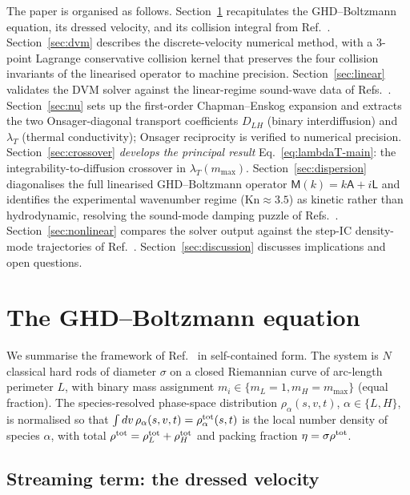\documentclass[aps,pre,twocolumn,superscriptaddress,longbibliography,floatfix]{revtex4-2}
\begin{document}
The paper is organised as follows.
Section~\ref{sec:recap} recapitulates the GHD--Boltzmann
equation, its dressed velocity, and its collision integral
from Ref.~\cite{PaperIV}.
Section~\ref{sec:dvm} describes the discrete-velocity numerical
method, with a 3-point Lagrange conservative collision kernel
that preserves the four collision invariants of the linearised
operator to machine precision.
Section~\ref{sec:linear} validates the DVM solver against
the linear-regime sound-wave data of
Refs.~\cite{PaperII,PaperIV}.
Section~\ref{sec:nu} sets up the first-order Chapman--Enskog
expansion and extracts the two Onsager-diagonal transport
coefficients $D_{LH}$ (binary interdiffusion) and $\lambda_T$
(thermal conductivity); Onsager reciprocity is verified to
numerical precision.
Section~\ref{sec:crossover} \emph{develops the principal
result} Eq.~\eqref{eq:lambdaT-main}: the
integrability-to-diffusion crossover in $\lambda_T(m_{\max})$.
Section~\ref{sec:dispersion} diagonalises the full
linearised GHD--Boltzmann operator
$\mathsf{M}(k)=k\mathsf{A}+i\mathsf{L}$ and identifies the
experimental wavenumber regime ($\mathrm{Kn}\approx 3.5$)
as kinetic rather than hydrodynamic, resolving the
sound-mode damping puzzle of Refs.~\cite{PaperII,PaperIV}.
Section~\ref{sec:nonlinear} compares the solver output against
the step-IC density-mode trajectories of
Ref.~\cite{PaperIII}.
Section~\ref{sec:discussion} discusses implications and open
questions.

\section{The GHD--Boltzmann equation}\label{sec:recap}

We summarise the framework of Ref.~\cite{PaperIV} in
self-contained form. The system is $N$ classical hard rods of
diameter $\sigma$ on a closed Riemannian curve of arc-length
perimeter $L$, with binary mass assignment
$m_i\in\{m_L=1, m_H=m_{\max}\}$ (equal fraction). The
species-resolved phase-space distribution
$\rho_\alpha(s,v,t)$, $\alpha\in\{L,H\}$, is normalised so that
$\int dv\,\rho_\alpha(s,v,t) = \rho_\alpha^{\rm tot}(s,t)$ is the
local number density of species $\alpha$, with total
$\rho^{\rm tot} = \rho_L^{\rm tot} + \rho_H^{\rm tot}$ and
packing fraction $\eta=\sigma\rho^{\rm tot}$.

\subsection{Streaming term: the dressed velocity}
\end{document}
